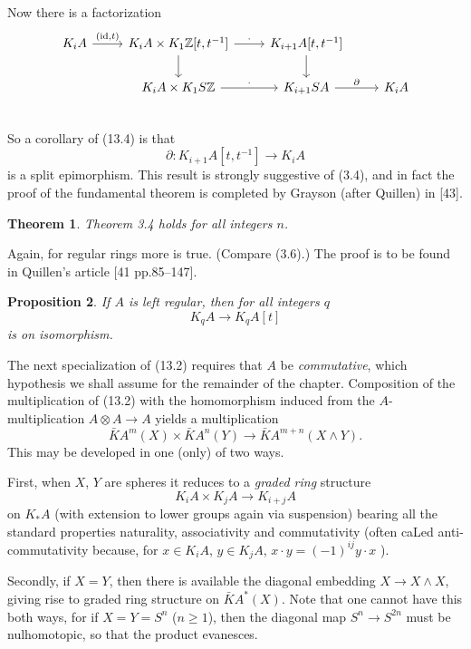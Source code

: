 \documentclass[openany,leqno]{book}  %
\newcommand{\id}{\mathrm{id}} %
\newtheorem{theorem}{Theorem}[chapter]
\newtheorem{prop}[theorem]{Proposition}
\begin{document}
Now there is a factorization
\[
 \begin{tikzcd}
 K_iA \arrow{r}{(\id,t)} & K_iA\times K_1 \mathbb{Z}[t,t^{-1}] \arrow[r,"\cdot"] \arrow[d] & K_{i+1}A[t,t^{-1}] \arrow[d]& \\
  &K_iA\times K_1 S\mathbb{Z} \arrow[r,"\cdot"] &K_{i+1}SA \arrow[r,"\partial"] &K_iA \\
 \end{tikzcd}
 \]
So a corollary of (13.4) is that
\[\partial \colon K_{i+1}A[t,t^{-1}] \longrightarrow K_iA\]
is a split epimorphism. This result is strongly suggestive of (3.4), and in fact the proof of the
fundamental theorem is completed by Grayson (after Quillen) in [43].
\begin{theorem}
Theorem 3.4 holds for all integers $n$.
\end{theorem}
Again, for regular rings more is true. (Compare (3.6).) The proof is to be found in Quillen's article [41 pp.85--147].

\begin{prop}
 	If $A$ is left regular, then for all integers $q$
\[K_qA \longrightarrow K_qA[t]\]
is on isomorphism.
 \end{prop} 

The next specialization of (13.2) requires that $A$ be {\em commutative}, which hypothesis we shall assume for the remainder of the chapter. Composition of the multiplication of (13.2) with the homomorphism induced from the $A$-multiplication $A \otimes A \longrightarrow A$ yields a multiplication
\[\bar{K}A^m(X) \times \bar{K}A^n(Y) \longrightarrow \bar{K}A^{m+n}(X \wedge Y).\]
This may be developed in one (only) of two ways.

First, when $X$, $Y$ are spheres it reduces to a {\em graded ring} structure
\[K_iA \times K_jA \longrightarrow K_{i+j}A\]
on $K_*A$ (with extension to lower groups again via suspension) bearing all the standard properties naturality, associativity and commutativity (often caLed anti-commutativity because, for $x\in K_iA$, $y \in K_jA$, $x \cdot y = (-1)^{ij} y\cdot x$ ).

Secondly, if $X = Y$, then there is available the diagonal embedding $X \longrightarrow X \wedge X$, giving rise to graded ring structure on $\bar{K}A^*(X)$. Note that one cannot have this both ways, for if $X = Y = S^n$ ($n\geqslant 1$), then the diagonal map $S^n \longrightarrow S^{2n}$ must be nulhomotopic, so that the product evanesces.
\end{document}
